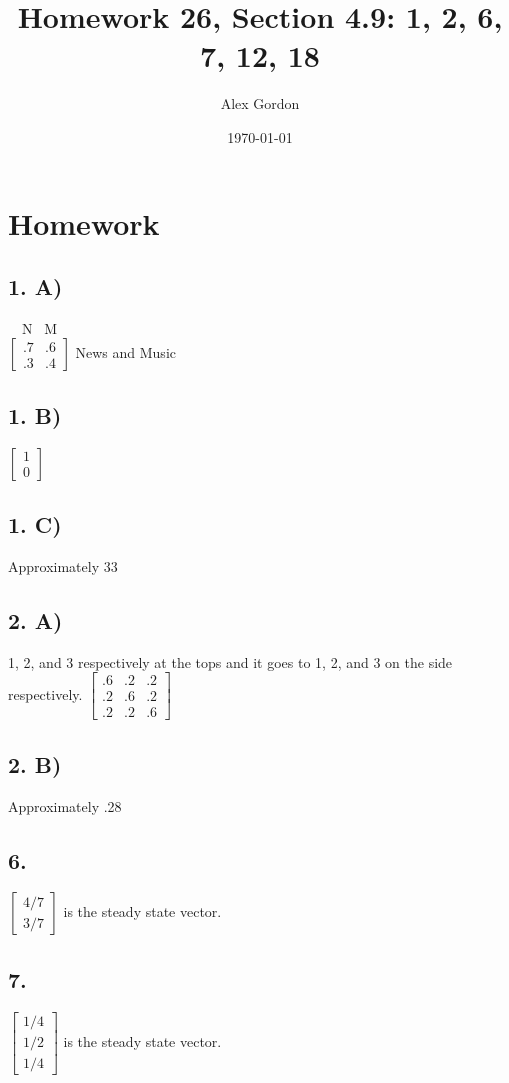 \documentclass[12]{scrartcl}
\begin{document}
\title{Homework 26, Section 4.9: 1, 2, 6, 7, 12, 18}
\author{Alex Gordon}
\date{\today}
\maketitle
\section*{Homework}
\subsection*{1. A)}
\ \ N  \ M \\
$\begin{bmatrix}  .7 & .6 \\ .3 & .4  \end{bmatrix} $ News and Music
\subsection*{1. B)}
$\begin{bmatrix}  1\\ 0  \end{bmatrix} $
\subsection*{1. C)}
Approximately 33%
\subsection*{2. A)}
1, 2, and 3 respectively at the tops and it goes to 1, 2, and 3 on the side respectively. 
$\begin{bmatrix}  .6 & .2 & .2 \\ .2 & .6 & .2 \\ .2 & .2 & .6  \end{bmatrix} $
\subsection*{2. B)}
Approximately .28
\subsection*{6.}
$\begin{bmatrix}  4/7 \\ 3/7  \end{bmatrix} $ is the steady state vector. 
\subsection*{7.}
$\begin{bmatrix}  1/4 \\ 1/2 \\ 1/4  \end{bmatrix} $  is the steady state vector. 
\end{document}
